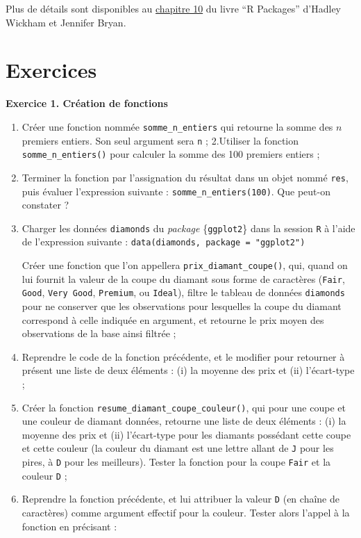 \documentclass[
  11pt,
]{book}
\makeatletter
\numberwithin{equation}{section}
\numberwithin{countremarque}{section}
\newcounter{exercices}[section]
\newenvironment{exframe}{%
 \def\at@end@of@exframe{}%
 \ifinner\ifhmode%
  \def\at@end@of@exframe{\end{minipage}}%
  \begin{minipage}{\columnwidth}%
 \fi\fi%
 \def\FrameCommand##1{\hskip\@totalleftmargin \hskip-\fboxsep
 \colorbox{shadecolorex}{##1}\hskip-\fboxsep
     \hskip-\linewidth \hskip-\@totalleftmargin \hskip\columnwidth}%
 \MakeFramed {\advance\hsize-\width
   \@totalleftmargin\z@ \linewidth\hsize
   \@setminipage}}%
 {\par\unskip\endMakeFramed%
 \at@end@of@exframe}
\makeatother
\begin{document}
Plus de détails sont disponibles au \href{(https://r-pkgs.org/man.html)}{chapitre 10} du livre ``R Packages'' d'Hadley Wickham et Jennifer Bryan.

\hypertarget{exercices-1}{%
\section{Exercices}\label{exercices-1}}

\begin{exframe}
\textbf{Exercice 1. Création de fonctions}

\begin{enumerate}
\def\labelenumi{\arabic{enumi}.}
\item
  Créer une fonction nommée \texttt{somme\_n\_entiers} qui retourne la somme des \(n\) premiers entiers. Son seul argument sera \texttt{n} ;
  2.Utiliser la fonction \texttt{somme\_n\_entiers()} pour calculer la somme des 100 premiers entiers ;
\item
  Terminer la fonction par l'assignation du résultat dans un objet nommé \texttt{res}, puis évaluer l'expression suivante : \texttt{somme\_n\_entiers(100)}. Que peut-on constater ?
\item
  Charger les données \texttt{diamonds} du \emph{package} \{\texttt{ggplot2}\} dans la session \texttt{R} à l'aide de l'expression suivante : \texttt{data(diamonds,\ package\ =\ "ggplot2")}

  Créer une fonction que l'on appellera \texttt{prix\_diamant\_coupe()}, qui, quand on lui fournit la valeur de la coupe du diamant sous forme de caractères (\texttt{Fair}, \texttt{Good}, \texttt{Very\ Good}, \texttt{Premium}, ou \texttt{Ideal}), filtre le tableau de données \texttt{diamonds} pour ne conserver que les observations pour lesquelles la coupe du diamant correspond à celle indiquée en argument, et retourne le prix moyen des observations de la base ainsi filtrée ;
\item
  Reprendre le code de la fonction précédente, et le modifier pour retourner à présent une liste de deux éléments : (i) la moyenne des prix et (ii) l'écart-type ;
\item
  Créer la fonction \texttt{resume\_diamant\_coupe\_couleur()}, qui pour une coupe et une couleur de diamant données, retourne une liste de deux éléments : (i) la moyenne des prix et (ii) l'écart-type pour les diamants possédant cette coupe et cette couleur (la couleur du diamant est une lettre allant de \texttt{J} pour les pires, à \texttt{D} pour les meilleurs). Tester la fonction pour la coupe \texttt{Fair} et la couleur \texttt{D} ;
\item
  Reprendre la fonction précédente, et lui attribuer la valeur \texttt{D} (en chaîne de caractères) comme argument effectif pour la couleur. Tester alors l'appel à la fonction en précisant :
\end{enumerate}


\end{exframe}
\end{document}
